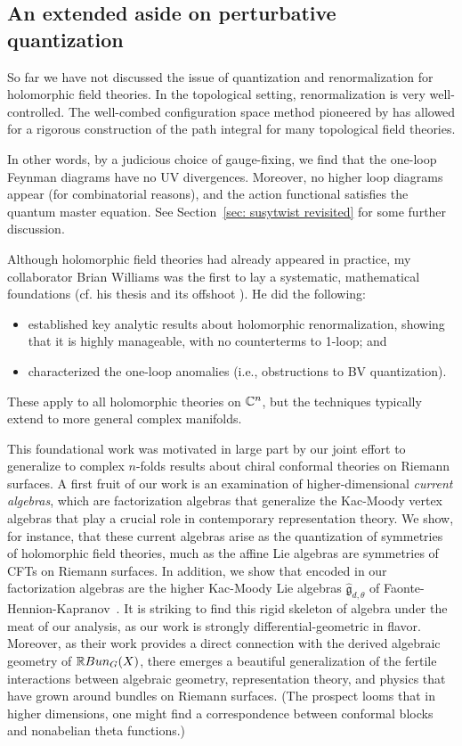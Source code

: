 \documentclass[11pt]{amsart}
\def\g{{\mathfrak g}}
\begin{document}
\subsection{An extended aside on perturbative quantization}

So far we have not discussed the issue of quantization and renormalization for holomorphic field theories.
In the topological setting, renormalization is very well-controlled.
The well-combed configuration space method pioneered by \cite{} has allowed for a rigorous construction of the path integral for many topological field theories. 


In other words, by a judicious choice of gauge-fixing, 
we find that the one-loop Feynman diagrams have no UV divergences.
Moreover, no higher loop diagrams appear (for combinatorial reasons),
and the action functional satisfies the quantum master equation.
See Section~\ref{sec: susytwist revisited} for some further discussion.

Although holomorphic field theories had already appeared in practice,
my collaborator Brian Williams was the first to lay a systematic, mathematical foundations (cf. his thesis \cite{BWthesis} and its offshoot \cite{BWhol}).
He did the following:
\begin{itemize}
\item established key analytic results about holomorphic renormalization, 
showing that it is highly manageable, with no counterterms to 1-loop; and
\item characterized the one-loop anomalies  (i.e., obstructions to BV quantization).
\end{itemize}
These apply to all holomorphic theories on $\mathbb C^n$,
but the techniques typically extend to more general complex manifolds.

This foundational work was motivated in large part by our joint effort to generalize to complex $n$-folds results about chiral conformal theories on Riemann surfaces.
A first fruit of our work \cite{GWcurr} is an examination of higher-dimensional {\em current algebras},
which are factorization algebras that generalize the Kac-Moody vertex algebras that play a crucial role in contemporary representation theory.
We show, for instance, that these current algebras arise as the quantization of symmetries of holomorphic field theories, 
much as the affine Lie algebras are symmetries of CFTs on Riemann surfaces.
In addition, we show that encoded in our factorization algebras are the higher Kac-Moody Lie algebras $\widehat{\g}_{d,\theta}$ of Faonte-Hennion-Kapranov~\cite{FHK}. 
It is striking to find this rigid skeleton of algebra under the meat of our analysis,
as our work is strongly differential-geometric in flavor.
Moreover, as their work provides a direct connection with the derived algebraic geometry of $\mathbb R Bun_G(X)$,
there emerges a beautiful generalization of the fertile interactions between algebraic geometry, representation theory, and physics that have grown around bundles on Riemann surfaces.
(The prospect looms that in higher dimensions,
one might find a correspondence between conformal blocks and nonabelian theta functions.)
\end{document}
